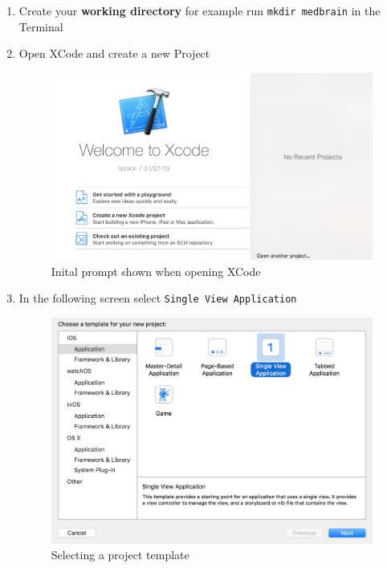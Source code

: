 \documentclass{article}
\begin{document}
\begin{enumerate}
\def\labelenumi{\arabic{enumi}.}
\item
  Create your \textbf{working directory} for example run
  \texttt{mkdir\ medbrain} in the Terminal
\item
  Open XCode and create a new Project

\begin{figure}[H]
\centering
\includegraphics[width=\linewidth]{resources/step1/step_1_1.png}
\caption{Inital prompt shown when opening XCode}
\label{fig:create_project_screen}
\end{figure}

\item
  In the following screen select \texttt{Single\ View\ Application}

  \begin{figure}[H]
  \centering
  \includegraphics[width=\linewidth]{resources/step1/step_1_2.png}
  \caption{Selecting a project template}
  \label{fig:selecting_project_template}
  \end{figure}


\end{enumerate}
\end{document}
